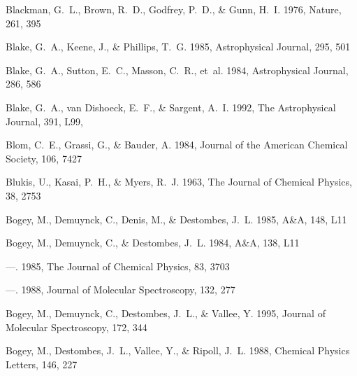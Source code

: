 \documentclass[twocolumn]{aastex631}
\begin{document}
\begin{thebibliography}{}
Blackman, G.~L., Brown, R.~D., Godfrey, P.~D., \& Gunn, H.~I. 1976, Nature,
  261, 395

Blake, G.~A., Keene, J., \& Phillips, T.~G. 1985, Astrophysical Journal, 295,
  501

Blake, G.~A., Sutton, E.~C., Masson, C.~R., {et~al.} 1984, Astrophysical
  Journal, 286, 586

{Blake}, G.~A., {van Dishoeck}, E.~F., \& {Sargent}, A.~I. 1992, The
  Astrophysical Journal, 391, L99, 

Blom, C.~E., Grassi, G., \& Bauder, A. 1984, Journal of the American Chemical
  Society, 106, 7427

Blukis, U., Kasai, P.~H., \& Myers, R.~J. 1963, The Journal of Chemical
  Physics, 38, 2753

Bogey, M., Demuynck, C., Denis, M., \& Destombes, J.~L. 1985{},
  A{\&}A, 148, L11

Bogey, M., Demuynck, C., \& Destombes, J.~L. 1984, A{\&}A, 138, L11

---. 1985{}, The Journal of Chemical Physics, 83, 3703

---. 1988{}, Journal of Molecular Spectroscopy, 132, 277

Bogey, M., Demuynck, C., Destombes, J.~L., \& Vallee, Y. 1995, Journal of
  Molecular Spectroscopy, 172, 344

Bogey, M., Destombes, J.~L., Vallee, Y., \& Ripoll, J.~L. 1988{},
  Chemical Physics Letters, 146, 227


\end{thebibliography}
\end{document}
